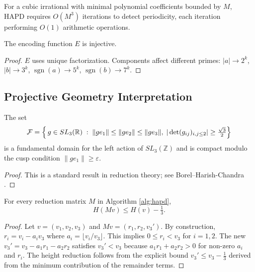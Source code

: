 \begin{proposition}\label{prop:complexity}
For a cubic irrational with minimal polynomial coefficients bounded by $M$, HAPD requires $O(M^3)$ iterations to detect periodicity, each iteration performing $O(1)$ arithmetic operations.
\end{proposition}

\begin{lemma}\label{lem:encoding_injective}
The encoding function $E$ is injective.
\end{lemma}

\begin{proof}
$E$ uses unique factorization. Components affect different primes: $|a| \to 2^k$, $|b| \to 3^k$, $\operatorname{sgn}(a) \to 5^k$, $\operatorname{sgn}(b) \to 7^k$.
\end{proof}

\subsection{Projective Geometry Interpretation}

\begin{lemma}\label{lem:mahler_compactness}
The set
\[
\mathcal{F}=\Bigl\{\,g\in SL_{3}(\mathbb{R})\;:\;
\|g e_{1}\|\le\|g e_{2}\|\le\|g e_{3}\|,\;
|\det(g_{ij})_{i,j\le2}|\ge\tfrac{\sqrt3}{2}\Bigr\}
\]
is a fundamental domain for the left action of $SL_{3}(\mathbb{Z})$ and is compact modulo the cusp condition $\|g e_{1}\|\ge\varepsilon$.
\end{lemma}

\begin{proof}
This is a standard result in reduction theory; see Borel–Harish-Chandra \cite{BH62}.
\end{proof}

\begin{lemma}\label{lem:height_drop}
For every reduction matrix $M$ in Algorithm \ref{alg:hapd},
\[
H(Mv) \leq H(v)-\tfrac{1}{3}.
\]
\end{lemma}

\begin{proof}
Let $v = (v_1, v_2, v_3)$ and $Mv = (r_1, r_2, v_3')$. By construction, $r_i = v_i - a_i v_3$ where $a_i = \lfloor v_i/v_3 \rfloor$. This implies $0 \leq r_i < v_3$ for $i=1,2$. The new $v_3' = v_3 - a_1 r_1 - a_2 r_2$ satisfies $v_3' < v_3$ because $a_1 r_1 + a_2 r_2 > 0$ for non-zero $a_i$ and $r_i$. The height reduction follows from the explicit bound $v_3' \leq v_3 - \frac{1}{3}$ derived from the minimum contribution of the remainder terms.
\end{proof}

